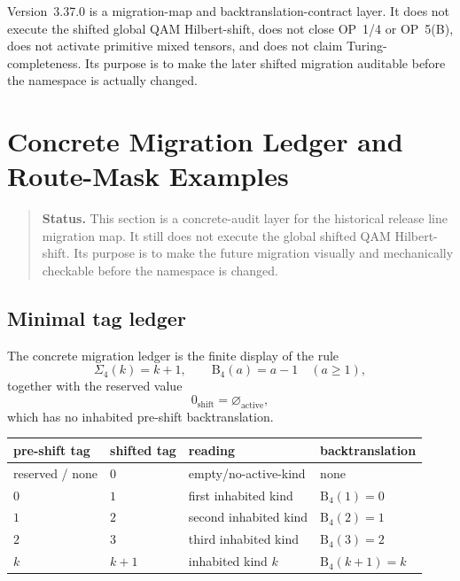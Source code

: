 \begin{remark}
\label{rem:v3370-non-claim}
Version~3.37.0 is a migration-map and backtranslation-contract layer. It does
not execute the shifted global QAM Hilbert-shift, does not close OP~1/4 or OP~5(B),
does not activate primitive mixed tensors, and does not claim
Turing-completeness. Its purpose is to make the later shifted migration auditable
before the namespace is actually changed.
\end{remark}



\clearpage
\section{ Concrete Migration Ledger and Route-Mask Examples}
\label{sec:v3371-concrete-migration-ledger-route-mask-examples}

\begin{quote}\small
\noindent\textbf{Status.}
This section is a concrete-audit layer for the historical release line migration map. It still
does not execute the global shifted QAM Hilbert-shift. Its purpose is to make the
future migration visually and mechanically checkable before the namespace is
changed.
\end{quote}

\subsection{Minimal tag ledger}
\label{subsec:v3371-minimal-tag-ledger}

\begin{definition}
\label{def:v3371-concrete-migration-ledger}
The concrete migration ledger is the finite display of the rule
\[
 \Sigma_4(k)=k+1,
 \qquad
 \mathrm B_4(a)=a-1\quad(a\geq 1),
\]
together with the reserved value
\[
 0_{\mathrm{shift}}=\varnothing_{\mathrm{active}},
\]
which has no inhabited pre-shift backtranslation.
\end{definition}

\begin{center}
\small
\begin{tabular}{@{}llll@{}}
\toprule
pre-shift tag & shifted tag & reading & backtranslation\\
\midrule
reserved / none & $0$ & empty/no-active-kind & none\\
$0$ & $1$ & first inhabited kind & $\mathrm B_4(1)=0$\\
$1$ & $2$ & second inhabited kind & $\mathrm B_4(2)=1$\\
$2$ & $3$ & third inhabited kind & $\mathrm B_4(3)=2$\\
$k$ & $k+1$ & inhabited kind $k$ & $\mathrm B_4(k+1)=k$\\
\bottomrule
\end{tabular}
\end{center}

